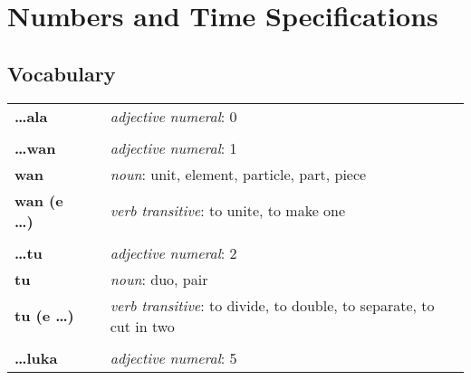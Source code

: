 \section{Numbers and Time Specifications}
%
%
\subsection*{Vocabulary}
%
\begin{supertabular}{p{2,5cm}|ll}
    \textbf{\dots ala}       &  & \textit{adjective numeral}: 0                                                    \\ %
                             &  &                                                                                  \\ %
    \textbf{\dots wan}       &  & \textit{adjective numeral}: 1                                                    \\ %
    \textbf{wan}             &  & \textit{noun}: unit, element, particle, part, piece                              \\ %
    \textbf{wan (e \dots)}   &  & \textit{verb transitive}: to unite, to make one                                  \\ %
                             &  &                                                                                  \\ %
    \textbf{\dots tu}        &  & \textit{adjective numeral}: 2                                                    \\ %
    \textbf{tu}              &  & \textit{noun}: duo, pair                                                         \\ %
    \textbf{tu (e \dots)}    &  & \textit{verb transitive}: to divide, to double, to separate, to cut in two       \\ %
                             &  &                                                                                  \\ %
    \textbf{\dots luka}      &  & \textit{adjective numeral}: 5                                                    \\ %

\end{supertabular}
